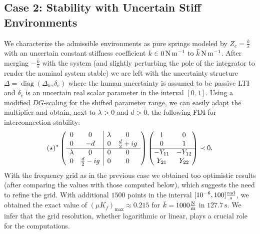 \subsection{Case 2: Stability with Uncertain Stiff Environments}\label{sec:numcase2}
We characterize the admissible environments as pure springs modeled by
$Z_e = \frac{k}{s}$ with an uncertain constant stiffness coefficient 
$k\in\SIrange[parse-numbers = false]{0}{\text{$\bar{k}$}}{\newton\per\metre}$. After merging $-\frac{\bar{k}}{s}$ with the 
system (and slightly perturbing the pole of the integrator to render the nominal system 
stable) we are left with the uncertainty structure $\Delta = \operatorname{diag}(\Delta_h, 
\delta_e )$ where the human uncertainty is assumed to be passive LTI and $\delta_e$ is an 
uncertain real scalar parameter in the interval $[0,1]$. Using a modified $DG$-scaling for 
the shifted parameter range, we can easily adapt the multiplier and obtain, next to 
$\lambda>0$ and $d>0$, the following FDI for interconnection stability:
\begin{equation}%
({\star})^*\left(\begin{array}{cc|cc}
      0&0  &\lambda &0 \\
      0&-d  &0         &\frac{d}{2} + ig\\ \hline
      \lambda &0 &0 &0\\
      0 &\frac{d}{2} - ig&0 &0
\end{array}\right)
\pmatr{1 &0\\0 &1\\\hline-Y_{11} &-Y_{12}\\Y_{21} &Y_{22}} \prec 0.
\label{eq:uncenvFDI}
\end{equation}
With the frequency grid as in the previous case we obtained too optimistic results (after 
comparing the values with those computed below), which suggests the need to refine the grid.
With additional  $1500$ points in the interval $[10^{-6},100]\si[per-mode=fraction]{\radian\per\second}$,
we obtained the exact value of $(\mu K_f)_\text{max}\approx 0.215$ for 
$\bar{k}=1000\si[per-mode=fraction]{\newton\per\metre}$ in $\SI{127.7}{\second}$. 
We infer that the grid resolution, whether logarithmic or linear, plays a crucial role 
for the computations.

